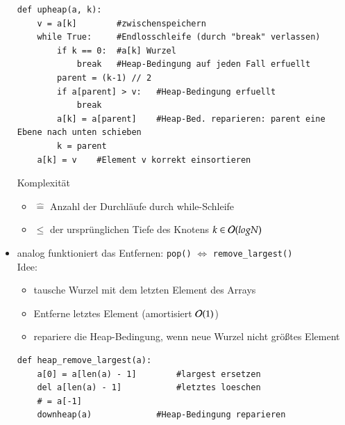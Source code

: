 \begin{itemize}
\begin{verbatim}
def upheap(a, k):
    v = a[k]        #zwischenspeichern
    while True:     #Endlosschleife (durch "break" verlassen)
        if k == 0:  #a[k] Wurzel
            break   #Heap-Bedingung auf jeden Fall erfuellt
        parent = (k-1) // 2
        if a[parent] > v:   #Heap-Bedingung erfuellt
            break
        a[k] = a[parent]    #Heap-Bed. reparieren: parent eine Ebene nach unten schieben
        k = parent
    a[k] = v    #Element v korrekt einsortieren
        \end{verbatim}
        Komplexität
        \begin{itemize}[label={}]
            \item $\widehat{=}$ Anzahl der Durchläufe durch while-Schleife
            \item $\leq$ der ursprünglichen Tiefe des Knotens $ k \in \mathcal{O}{}(logN)$
        \end{itemize}
        \item analog funktioniert das Entfernen: \verb|pop()| $\Leftrightarrow$ \verb|remove_largest()| \\
        Idee:
        \begin{itemize}
            \item tausche Wurzel mit dem letzten Element des Arrays
            \item Entferne letztes Element (amortisiert $\mathcal{O}{}(1)$)
            \item repariere die Heap-Bedingung, wenn neue Wurzel nicht größtes Element
        \end{itemize}
        \begin{verbatim}
def heap_remove_largest(a):
    a[0] = a[len(a) - 1]        #largest ersetzen
    del a[len(a) - 1]           #letztes loeschen
    # = a[-1]
    downheap(a)             #Heap-Bedingung reparieren


\end{verbatim}
\end{itemize}
